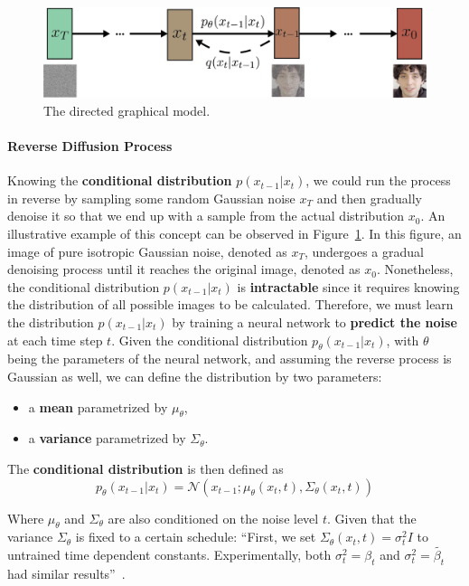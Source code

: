 \documentclass[preprint]{elsarticle}
\begin{document}
\begin{figure}[b]
	\centering
	\includegraphics[scale=0.74, keepaspectratio]{img/background_img/Diffusion2.png}
	\caption{The directed graphical model.}\label{fig:m-chain}
\end{figure}


\paragraph{Reverse Diffusion Process} Knowing the \textbf{conditional distribution} $p(x_{t-1}|x_t)$, we could run the process in reverse by sampling some random Gaussian noise $x_T$ and then gradually denoise it so that we end up with a sample from the actual distribution $x_0$.
An illustrative example of this concept can be observed in Figure~\ref{fig:m-chain}. In this figure, an image of pure isotropic Gaussian noise, denoted as $x_T$, undergoes a gradual denoising process until it reaches the original image, denoted as $x_0$.
Nonetheless, the conditional distribution $p(x_{t-1}|x_t)$ is \textbf{intractable} since it requires knowing the distribution of all possible images to be calculated.
Therefore, we must learn the distribution $p(x_{t-1}|x_t)$ by training a neural network to \textbf{predict the noise} at each time step $t$. Given the conditional distribution $p_\theta(x_{t-1}|x_t)$, 
with $\theta$ being the parameters of the neural network, and assuming the reverse process is Gaussian as well, we can define the distribution by two parameters:

\begin{itemize}
	\item a \textbf{mean} parametrized by $\mu_\theta$,
	\item a \textbf{variance} parametrized by $\Sigma_\theta$.
\end{itemize}

The \textbf{conditional distribution} is then defined as
\begin{equation}
	p_\theta(x_{t-1}|x_t) = \mathcal{N}(x_{t-1}; \mu_\theta(x_t,t), \Sigma_\theta(x_t,t))
\end{equation}

Where $\mu_\theta$ and $\Sigma_\theta$ are also conditioned on the noise level $t$.
Given that the variance $\Sigma_\theta$ is fixed to a certain schedule: ``First, we set $\Sigma_\theta(x_t,t)=\sigma_t^2I$ to untrained time dependent constants. Experimentally, both $\sigma_t^2=\beta_t$ and $\sigma_t^2=\tilde{\beta_t}$ had similar results''~\cite{ho2020denoising}.
\end{document}

